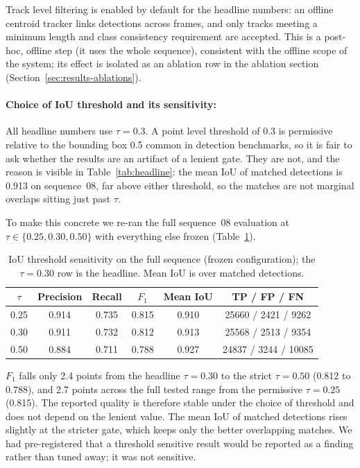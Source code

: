 \documentclass[a4paper,12pt]{report}
\begin{document}
Track level filtering is enabled by default for the headline numbers: an offline
centroid tracker links detections across frames, and only tracks meeting a
minimum length and class consistency requirement are accepted. This is a
post-hoc, offline step (it uses the whole sequence), consistent with the
offline scope of the system; its effect is isolated as an ablation row in the
ablation section (Section~\ref{sec:results-ablations}).

\paragraph{Choice of IoU threshold and its sensitivity:}
\label{sec:eval-iou-threshold}

All headline numbers use $\tau = 0.3$. A point level threshold of 0.3 is
permissive relative to the bounding box 0.5 common in detection benchmarks, so
it is fair to ask whether the results are an artifact of a lenient gate. They
are not, and the reason is visible in Table~\ref{tab:headline}: the mean IoU of
matched detections is \num{0.913} on sequence~08, far above either threshold, so
the matches are not marginal overlaps sitting just past $\tau$.

To make this concrete we re-ran the full sequence~08 evaluation at
$\tau \in \{0.25, 0.30, 0.50\}$ with everything else frozen
(Table~\ref{tab:iou-sensitivity}).

\begin{table}[H]
  \centering
  \caption[IoU threshold sensitivity]{IoU threshold sensitivity on the full
    sequence (frozen configuration); the $\tau = 0.30$ row is the headline. Mean IoU is
    over matched detections.}
  \label{tab:iou-sensitivity}
  \begin{tabular}{cccccc}
    \toprule
    $\tau$ & Precision & Recall & $F_1$ & Mean IoU & TP / FP / FN \\
    \midrule
    0.25 & 0.914 & 0.735 & 0.815 & 0.910 & \num{25660} / \num{2421} / \num{9262} \\
    0.30 & 0.911 & 0.732 & 0.812 & 0.913 & \num{25568} / \num{2513} / \num{9354} \\
    0.50 & 0.884 & 0.711 & 0.788 & 0.927 & \num{24837} / \num{3244} / \num{10085} \\
    \bottomrule
  \end{tabular}
\end{table}

$F_1$ falls only \num{2.4} points from the headline $\tau = 0.30$ to the strict
$\tau = 0.50$ (\num{0.812} to \num{0.788}), and \num{2.7} points across the full
tested range from the permissive $\tau = 0.25$ (\num{0.815}). The reported
quality is therefore stable under the choice of threshold and does not depend on the lenient
value. The mean IoU of matched detections rises slightly at the stricter gate, which keeps
only the better overlapping matches. We had
pre-registered that a threshold sensitive result would be reported as a
finding rather than tuned away; it was not sensitive.
\end{document}
